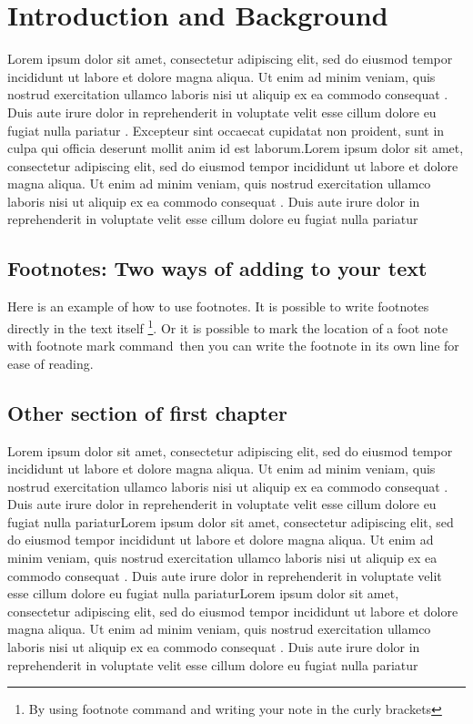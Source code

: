 \chapter{Introduction and Background}
Lorem ipsum dolor sit amet, consectetur adipiscing elit, sed do eiusmod tempor incididunt ut labore et dolore magna aliqua. Ut enim ad minim veniam, quis nostrud exercitation ullamco laboris nisi ut aliquip ex ea commodo consequat \cite{ref1}. Duis aute irure dolor in reprehenderit in voluptate velit esse cillum dolore eu fugiat nulla pariatur \cite{ref2}. Excepteur sint occaecat cupidatat non proident, sunt in culpa qui officia deserunt mollit anim id est laborum.Lorem ipsum dolor sit amet, consectetur adipiscing elit, sed do eiusmod tempor incididunt ut labore et dolore magna aliqua. Ut enim ad minim veniam, quis nostrud exercitation ullamco laboris nisi ut aliquip ex ea commodo consequat \cite{ref1}. Duis aute irure dolor in reprehenderit in voluptate velit esse cillum dolore eu fugiat nulla pariatur

\section{Footnotes: Two ways of adding to your text}

Here is an example of how to use footnotes. It is possible to write footnotes directly in the text itself \footnote{By using footnote command and writing your note in the curly brackets}. Or it is possible to mark the location of a foot note with footnote mark command\footnotemark \, then you can write the footnote in its own line for ease of reading. 


\section{Other section of first chapter}

Lorem ipsum dolor sit amet, consectetur adipiscing elit, sed do eiusmod tempor incididunt ut labore et dolore magna aliqua. Ut enim ad minim veniam, quis nostrud exercitation ullamco laboris nisi ut aliquip ex ea commodo consequat \cite{ref1}. Duis aute irure dolor in reprehenderit in voluptate velit esse cillum dolore eu fugiat nulla pariaturLorem ipsum dolor sit amet, consectetur adipiscing elit, sed do eiusmod tempor incididunt ut labore et dolore magna aliqua. Ut enim ad minim veniam, quis nostrud exercitation ullamco laboris nisi ut aliquip ex ea commodo consequat \cite{ref1}. Duis aute irure dolor in reprehenderit in voluptate velit esse cillum dolore eu fugiat nulla pariaturLorem ipsum dolor sit amet, consectetur adipiscing elit, sed do eiusmod tempor incididunt ut labore et dolore magna aliqua. Ut enim ad minim veniam, quis nostrud exercitation ullamco laboris nisi ut aliquip ex ea commodo consequat \cite{ref1}. Duis aute irure dolor in reprehenderit in voluptate velit esse cillum dolore eu fugiat nulla pariatur

